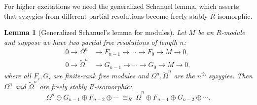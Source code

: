 \documentclass[aps,prx,english,superscriptaddress,twocolumn,tightenlines,showpacs,longbibliography,floatfix,amsfonts]{revtex4-2}
\newtheorem{lemma}{Lemma}
\theoremstyle{remark}
\theoremstyle{definition}
\begin{document}
For higher excitations we need the generalized Schanuel lemma, which asserts
that syzygies from different partial resolutions become freely stably
\(R\)-isomorphic.

\begin{lemma}[Generalized Schanuel's lemma for modules]
	\label{lem:generalized-schanuel-modules}
	Let $M$ be an $R$-module and suppose we have two partial free
	resolutions of length $n$:
	\begin{align}
		0 \to \Omega^n &\to F_{n-1} \to \cdots \to F_0 \to M \to 0,
		\label{eq:res1}\\
		0 \to \widetilde{\Omega}^n &\to G_{n-1} \to \cdots \to G_0 \to M \to 0,
		\label{eq:res2}
	\end{align}
	where all $F_i,G_i$ are finite‑rank free modules and
	$\Omega^n,\widetilde{\Omega}^n$ are the $n^{\text{th}}$ syzygies. Then
	$\Omega^n$ and $\widetilde{\Omega}^n$ are freely stably \(R\)-isomorphic:
	\begin{equation}
		\Omega^n \oplus G_{n-1} \oplus F_{n-2} \oplus \cdots
		\;\cong_R\;
		\widetilde{\Omega}^n \oplus F_{n-1} \oplus G_{n-2} \oplus \cdots .
	\end{equation}
\end{lemma}
\end{document}
